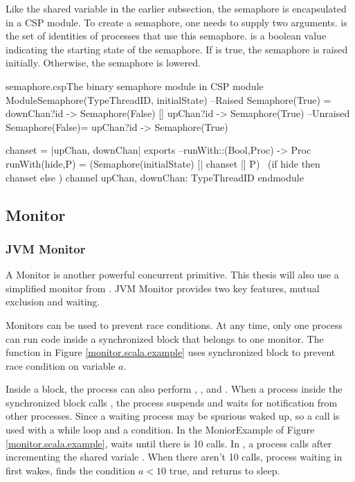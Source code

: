 \documentclass[a4paper, 12pt]{article}
\begin{document}
Like the shared variable in the earlier subsection, the semaphore is encapsulated in a CSP module. To create a semaphore, one needs to supply two arguments.  is the set of identities of processes that use this semaphore.  is a boolean value indicating the starting state of the semaphore. If  is true, the semaphore is raised initially. Otherwise, the semaphore is lowered. 
\begin{cspfloat}{semaphore.csp}{The binary semaphore module in CSP}
module ModuleSemaphore(TypeThreadID, initialState)
  --Raised
  Semaphore(True) = downChan?id -> Semaphore(False)
                   [] upChan?id -> Semaphore(True)
  --Unraised
  Semaphore(False)= upChan?id   -> Semaphore(True)
  
  chanset = {|upChan, downChan|}
exports
  --runWith::(Bool,Proc) -> Proc
  runWith(hide,P) = (Semaphore(initialState) [| chanset |] P) \ 
                     (if hide then chanset else {})
  channel upChan, downChan: TypeThreadID
endmodule
\end{cspfloat}

\subsection{Monitor}
\subsubsection{JVM Monitor}
A Monitor is another powerful concurrent primitive. This thesis will also use a simplified monitor from \cite{CPinJava}. JVM Monitor provides two key features, mutual exclusion and waiting. 

Monitors can be used to prevent race conditions. At any time, only one process can run code inside a synchronized block that belongs to one monitor. The function  in Figure \ref{monitor.scala.example} uses synchronized block to prevent race condition on variable $a$. 

Inside a  block, the process can also perform , , and . When a process inside the synchronized block calls , the process suspends and waits for notification from other processes. Since a waiting process may be spurious waked up, so a  call is used with a while loop and a condition. In the MoniorExample of Figure \ref{monitor.scala.example},  waits until there is 10  calls. In , a process calls  after incrementing the shared variale . When there aren't 10  calls, process waiting in  first wakes, finds the condition $a<10$ true, and returns to sleep. 
\end{document}
